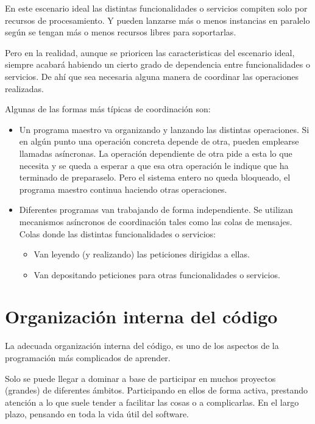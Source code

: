 \documentclass[spanish,12pt,a4paper,final,oneside]{book}
\begin{document}
En este escenario ideal las distintas funcionalidades o servicios compiten solo por recursos de procesamiento. Y pueden lanzarse más o menos instancias en paralelo según se tengan más o menos recursos libres para soportarlas.

Pero en la realidad, aunque se prioricen las caracteristicas del escenario ideal, siempre acabará habiendo un cierto grado de dependencia entre funcionalidades o servicios. De ahí que sea necesaria alguna manera de coordinar las operaciones realizadas.

Algunas de las formas más típicas de coordinación son:

\begin{itemize}
 
\item Un programa maestro va organizando y lanzando las distintas operaciones. Si en algún punto una operación concreta depende de  otra, pueden emplearse llamadas asíncronas. La operación dependiente de otra pide a esta lo que necesita y se queda a esperar a que esa otra operación le indique que ha terminado de preparaselo. Pero el sistema entero no queda bloqueado, el programa maestro continua haciendo otras operaciones. 

\item Diferentes programas van trabajando de forma independiente. Se utilizan mecanismos asíncronos de coordinación tales como las colas de mensajes. Colas donde las distintas funcionalidades o servicios:
\begin{itemize}
\item Van leyendo (y realizando) las peticiones dirigidas a ellas.
\item Van depositando peticiones para otras funcionalidades o servicios.
\end{itemize}

\end{itemize}


\chapter{Organización interna del código}

La adecuada organización interna del código, es uno de los aspectos de la programación más complicados de aprender.

Solo se puede llegar a dominar a base de participar en muchos proyectos (grandes) de diferentes ámbitos. Participando en ellos de forma activa, prestando atención a lo que suele tender a facilitar las cosas o a complicarlas. En el largo plazo, pensando en toda la vida útil del software.
\end{document}
